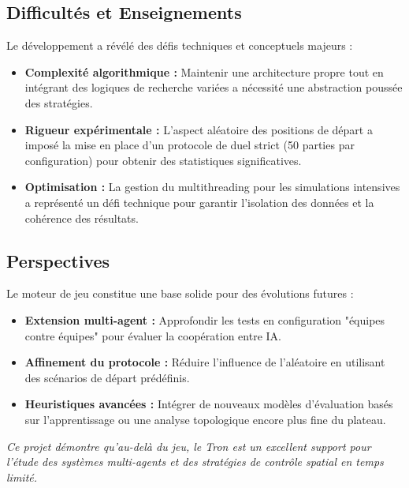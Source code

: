 \documentclass[11pt,a4paper]{article}
\begin{document}
\subsection{Difficultés et Enseignements}
Le développement a révélé des défis techniques et conceptuels majeurs :
\begin{itemize}
    \item \textbf{Complexité algorithmique :} Maintenir une architecture propre tout en intégrant des logiques de recherche variées a nécessité une abstraction poussée des stratégies.
    \item \textbf{Rigueur expérimentale :} L'aspect aléatoire des positions de départ a imposé la mise en place d'un protocole de duel strict (50 parties par configuration) pour obtenir des statistiques significatives.
    \item \textbf{Optimisation :} La gestion du multithreading pour les simulations intensives a représenté un défi technique pour garantir l'isolation des données et la cohérence des résultats.
\end{itemize}

\subsection{Perspectives}
Le moteur de jeu constitue une base solide pour des évolutions futures :
\begin{itemize}
    \item \textbf{Extension multi-agent :} Approfondir les tests en configuration "équipes contre équipes" pour évaluer la coopération entre IA.
    \item \textbf{Affinement du protocole :} Réduire l'influence de l'aléatoire en utilisant des scénarios de départ prédéfinis.
    \item \textbf{Heuristiques avancées :} Intégrer de nouveaux modèles d'évaluation basés sur l'apprentissage ou une analyse topologique encore plus fine du plateau.
\end{itemize}

\vspace{1cm}
\begin{center}
    \textit{Ce projet démontre qu'au-delà du jeu, le Tron est un excellent support pour l'étude des systèmes multi-agents et des stratégies de contrôle spatial en temps limité.}
\end{center}



\clearpage
\end{document}
